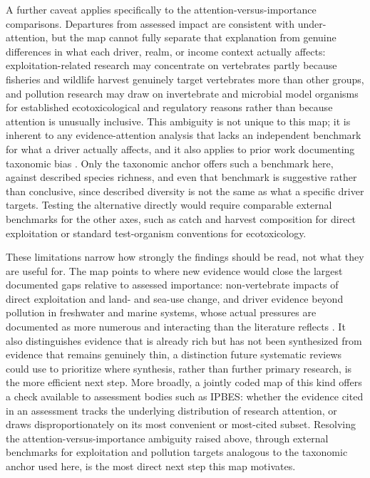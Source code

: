 \documentclass[12pt]{article}
\begin{document}
A further caveat applies specifically to the attention-versus-importance comparisons. Departures from assessed impact are consistent with under-attention, but the map cannot fully separate that explanation from genuine differences in what each driver, realm, or income context actually affects: exploitation-related research may concentrate on vertebrates partly because fisheries and wildlife harvest genuinely target vertebrates more than other groups, and pollution research may draw on invertebrate and microbial model organisms for established ecotoxicological and regulatory reasons rather than because attention is unusually inclusive. This ambiguity is not unique to this map; it is inherent to any evidence-attention analysis that lacks an independent benchmark for what a driver actually affects, and it also applies to prior work documenting taxonomic bias \cite{titley_scientific_2017, troudet2017taxonomic}. Only the taxonomic anchor offers such a benchmark here, against described species richness, and even that benchmark is suggestive rather than conclusive, since described diversity is not the same as what a specific driver targets. Testing the alternative directly would require comparable external benchmarks for the other axes, such as catch and harvest composition for direct exploitation or standard test-organism conventions for ecotoxicology.

These limitations narrow how strongly the findings should be read, not what they are useful for. The map points to where new evidence would close the largest documented gaps relative to assessed importance: non-vertebrate impacts of direct exploitation and land- and sea-use change, and driver evidence beyond pollution in freshwater and marine systems, whose actual pressures are documented as more numerous and interacting than the literature reflects \cite{Reid_freshwater}. It also distinguishes evidence that is already rich but has not been synthesized from evidence that remains genuinely thin, a distinction future systematic reviews could use to prioritize where synthesis, rather than further primary research, is the more efficient next step. More broadly, a jointly coded map of this kind offers a check available to assessment bodies such as IPBES: whether the evidence cited in an assessment tracks the underlying distribution of research attention, or draws disproportionately on its most convenient or most-cited subset. Resolving the attention-versus-importance ambiguity raised above, through external benchmarks for exploitation and pollution targets analogous to the taxonomic anchor used here, is the most direct next step this map motivates.
\end{document}

